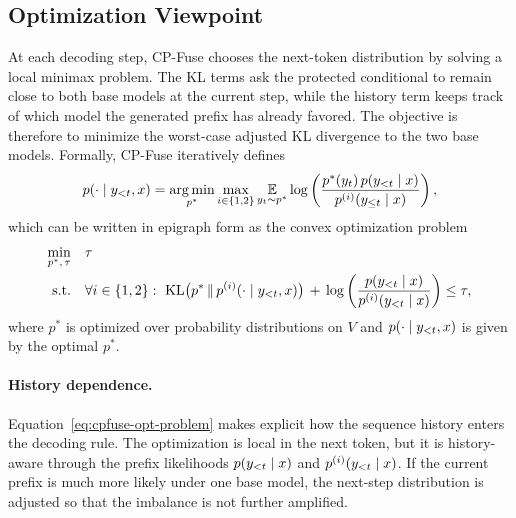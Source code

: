 
\subsection{Optimization Viewpoint}

At each decoding step, CP-Fuse chooses the next-token distribution by solving a local minimax problem. The KL terms ask the protected conditional to remain close to both base models at the current step, while the history term keeps track of which model the generated prefix has already favored. The objective is therefore to minimize the worst-case adjusted KL divergence to the two base models. Formally, CP-Fuse iteratively defines
\begin{equation}
\label{eq:cpfuse-opt-problem}
p(\cdot \mid y_{<t},x)
=
\operatorname*{arg\,min}_{p^*}
\max_{i \in \{1,2\}}
\underset{y_t \sim p^*}{\mathbb{E}}
\log\left(
\frac{p^*(y_t)\,p(y_{<t}\mid x)}
{p^{(i)}(y_{\leq t}\mid x)}
\right),
\end{equation}
which can be written in epigraph form as the convex optimization problem
\begin{equation}
\label{eq:cpfuse-opt-epigraph}
\begin{aligned}
\min_{p^*,\,\tau}\quad & \tau \\
\text{s.t.}\quad
&\forall i \in \{1,2\}:\ 
\KL\bigl(p^* \,\|\, \modeli(\cdot \mid y_{<t},x)\bigr)
\,+\,
\log\left(
\frac{\model(y_{<t}\mid x)}
{\modeli(y_{<t}\mid x)}
\right)
\leq \tau,
\end{aligned}
\end{equation}
where \(p^*\) is optimized over probability distributions on \(V\) and \(p(\cdot \mid y_{<t},x)\) is given by the optimal \(p^*\).

\paragraph{History dependence.}
Equation~\eqref{eq:cpfuse-opt-problem} makes explicit how the sequence history enters the decoding rule. The optimization is local in the next token, but it is history-aware through the prefix likelihoods \(p(y_{<t}\mid x)\) and \(p^{(i)}(y_{<t}\mid x)\). If the current prefix is much more likely under one base model, the next-step distribution is adjusted so that the imbalance is not further amplified.

